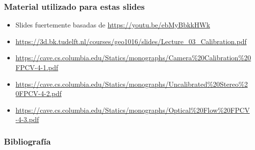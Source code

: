 \begin{frame}
    \frametitle{Material utilizado para estas slides}
    
    \footnotesize
    \begin{itemize}
        \item Slides fuertemente basadas de \url{https://youtu.be/ebMyBbkkHWk}
        \item \url{https://3d.bk.tudelft.nl/courses/geo1016/slides/Lecture_03_Calibration.pdf}
        \item \url{https://cave.cs.columbia.edu/Statics/monographs/Camera\%20Calibration\%20FPCV-4-1.pdf}
        \item \url{https://cave.cs.columbia.edu/Statics/monographs/Uncalibrated\%20Stereo\%20FPCV-4-2.pdf}
        \item \url{https://cave.cs.columbia.edu/Statics/monographs/Optical\%20Flow\%20FPCV-4-3.pdf}
    \end{itemize}
    
\end{frame}

\begin{frame}
	\frametitle{Bibliografía}
	\nocite{hartley2003multiple}
    \nocite{szeliski2022computer}
	
	\printbibliography
	
\end{frame}